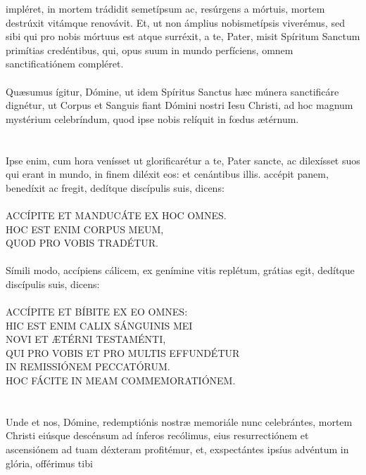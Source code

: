 \documentclass[12pt, a4paper]{article}
\begin{document}
	impléret, in mortem trádidit
	semetípsum ac, resúrgens a
	mórtuis, mortem destrúxit
	vitámque renovávit. Et, ut non
	ámplius nobismetípsis viverémus,
	sed sibi qui pro nobis mórtuus est
	atque surréxit, a te, Pater, misit
	Spíritum Sanctum primítias
	credéntibus, qui, opus suum in
	mundo perfíciens, omnem
	sanctificatiónem compléret.
	\\\\
	Quæsumus ígitur, Dómine, ut idem
	Spíritus Sanctus hæc múnera
	sanctificáre dignétur, ut Corpus et
	Sanguis fiant Dómini nostri Iesu
	Christi, ad hoc magnum mystérium
	celebríndum, quod ipse nobis
	relíquit in fœdus ætérnum.
	\\\\
	\\
	Ipse enim, cum hora venísset
	ut glorificarétur a te, Pater sancte,
	ac dilexísset suos qui erant in
	mundo, in finem diléxit eos:
	et cenántibus illis. accépit panem,
	benedíxit ac fregit, dedítque
	discípulis suis, dicens:
	\\\\
	ACCÍPITE ET MANDUCÁTE EX HOC
	OMNES.
	\\
	HOC EST ENIM CORPUS MEUM,
	\\
	QUOD PRO VOBIS TRADÉTUR.
	\\\\
	Símili modo, accípiens cálicem, ex
	genímine vitis replétum, grátias
	egit, dedítque discípulis suis, dicens:
	\\\\
	ACCÍPITE ET BÍBITE EX EO OMNES:
	\\
	HIC EST ENIM CALIX SÁNGUINIS MEI
	\\
	NOVI ET ÆTÉRNI TESTAMÉNTI,
	\\
	QUI PRO VOBIS ET PRO MULTIS EFFUNDÉTUR
	\\
	IN REMISSIÓNEM PECCATÓRUM.
	\\
	HOC FÁCITE IN MEAM COMMEMORATIÓNEM.
	\\\\
	\\
	Unde et nos, Dómine,
	redemptiónis nostræ memoriále
	nunc celebrántes, mortem Christi
	eiúsque descénsum ad ínferos
	recólimus, eius resurrectiónem et
	ascensiónem ad tuam déxteram
	profitémur, et, exspectántes ipsíus
	advéntum in glória, offérimus tibi
\end{document}
